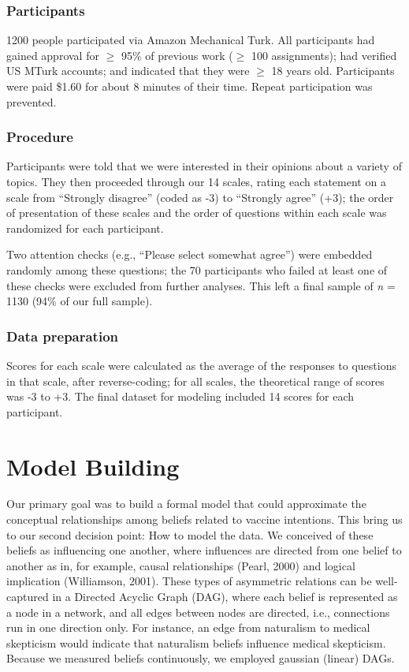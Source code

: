 \documentclass[10pt, letterpaper]{article}
\begin{document}
\subsubsection{Participants}\label{participants}

1200 people participated via Amazon Mechanical Turk. All participants
had gained approval for \(\geq\) 95\% of previous work (\(\geq\) 100
assignments); had verified US MTurk accounts; and indicated that they
were \(\geq\) 18 years old. Participants were paid \$1.60 for about 8
minutes of their time. Repeat participation was prevented.

\subsubsection{Procedure}\label{procedure}

Participants were told that we were interested in their opinions about a
variety of topics. They then proceeded through our 14 scales, rating
each statement on a scale from ``Strongly disagree'' (coded as -3) to
``Strongly agree'' (+3); the order of presentation of these scales and
the order of questions within each scale was randomized for each
participant.

Two attention checks (e.g., ``Please select somewhat agree'') were
embedded randomly among these questions; the 70 participants who failed
at least one of these checks were excluded from further analyses. This
left a final sample of \emph{n} = 1130 (94\% of our full sample).

\subsubsection{Data preparation}\label{data-preparation}

Scores for each scale were calculated as the average of the responses to
questions in that scale, after reverse-coding; for all scales, the
theoretical range of scores was -3 to +3. The final dataset for modeling
included 14 scores for each participant.

\section{Model Building}\label{model-building}

Our primary goal was to build a formal model that could approximate the
conceptual relationships among beliefs related to vaccine intentions.
This bring us to our second decision point: How to model the data. We
conceived of these beliefs as influencing one another, where influences
are directed from one belief to another as in, for example, causal
relationships (Pearl, 2000) and logical implication (Williamson, 2001).
These types of asymmetric relations can be well-captured in a Directed
Acyclic Graph (DAG), where each belief is represented as a node in a
network, and all edges between nodes are directed, i.e., connections run
in one direction only. For instance, an edge from naturalism to medical
skepticism would indicate that naturalism beliefs influence medical
skepticism. Because we measured beliefs continuously, we employed
gaussian (linear) DAGs.
\end{document}
